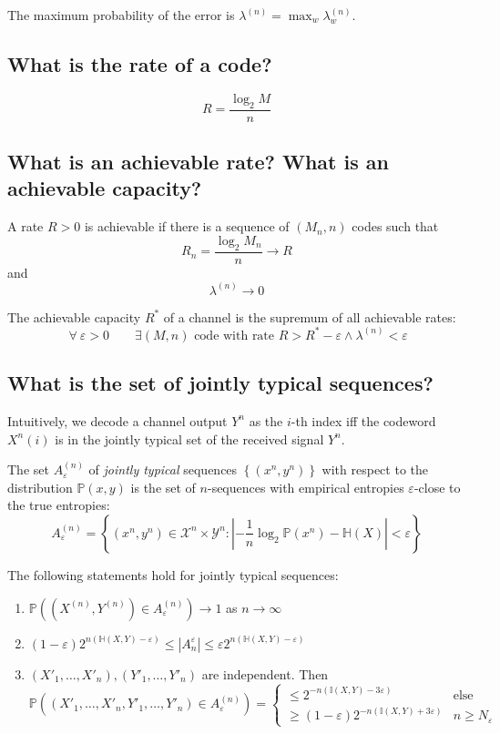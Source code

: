 \documentclass[a4paper]{article}
\newcommand\op[2][P]{\mathbb{#1}\left(#2\right)}
\newcommand\fall{\:\forall\:}
\newcommand\set[1]{\left\{#1\right\}}
\newcommand\key[1]{\textit{#1}}
\newcommand\card[1]{\left|#1\right|}
\newcommand\converges{\rightarrow}
\theoremstyle{definition}
\begin{document}
The maximum probability of the error is $\lambda^{(n)} = \max_w \lambda_w^{(n)}$.

\subsection{What is the rate of a code?}

\[ R = \frac{\log_2 M}{n} \]


\subsection{What is an achievable rate? What is an achievable capacity?}

A rate $R > 0$ is achievable if there is a sequence of $(M_n, n)$ codes such that
\[ R_n = \frac{\log_2 M_n}{n} \converges R \]
and
\[ \lambda^{(n)} \converges 0 \]

The achievable capacity $R^*$ of a channel is the supremum of all achievable rates:
\[
  \fall \varepsilon > 0 \qquad
  \exists (M,n) \text{ code with rate } R > R^* - \varepsilon \land \lambda^{(n)} < \varepsilon
\]

\subsection{What is the set of jointly typical sequences?}

Intuitively, we decode a channel output $Y^n$ as the $i$-th index iff the codeword $X^n(i)$ is in the jointly typical set of the received signal $Y^n$.

The set $A_\varepsilon^{(n)}$ of \key{jointly typical} sequences $\set{(x^n, y^n)}$ with respect to the distribution $\op{x,y}$ is the set of $n$-sequences with empirical entropies $\varepsilon$-close to the true entropies:
\[
	A_\varepsilon^{(n)} = \set{
		(x^n, y^n) \in \mathcal X^n \times \mathcal Y^n:
		\card{-\frac1{n} \log_2 \op{x^n} - \op[H]{X}} < \varepsilon
	}
\]

The following statements hold for jointly typical sequences:
\begin{enumerate}
  \item $\op{(X^{(n)}, Y^{(n)}) \in A_\varepsilon^{(n)}} \to 1$ as $n \to \infty$
  \item $(1 - \varepsilon) 2^{n(\op[H]{X,Y} - \varepsilon)} \leq \card{A_n^\varepsilon} \leq \varepsilon 2^{n(\op[H]{X,Y} - \varepsilon)}$
  \item $(X'_1, \ldots, X'_n), (Y'_1, \ldots, Y'_n)$ are independent. Then
    \[
		\op{(X'_1, \ldots, X'_n, Y'_1, \ldots, Y'_n) \in A_\varepsilon^{(n)}} =
		\begin{cases}
		  \leq 2^{-n(\op[I]{X,Y} - 3\varepsilon)} & \text{else} \\
		  \geq (1 - \varepsilon) 2^{-n (\op[I]{X,Y} + 3\varepsilon)} & n \geq N_\varepsilon
		\end{cases}
    \]
\end{enumerate}
\end{document}
